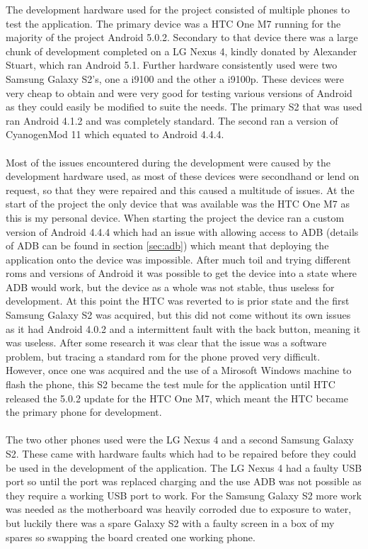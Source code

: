 The development hardware used for the project consisted of multiple phones to test the application. The primary device was a HTC One M7 running for the majority of the project Android 5.0.2. Secondary to that device there was a large chunk of development completed on a LG Nexus 4, kindly donated by Alexander Stuart, which ran Android 5.1. Further hardware consistently used were two Samsung Galaxy S2's, one a i9100 and the other a i9100p. These devices were very cheap to obtain and were very good for testing various versions of Android as they could easily be modified to suite the needs. The primary S2 that was used ran Android 4.1.2 and was completely standard. The second ran a version of CyanogenMod 11 which equated to Android 4.4.4.\\
\\
Most of the issues encountered during the development were caused by the development hardware used, as most of these devices were secondhand or lend on request, so that they were repaired and this caused a multitude of issues. At the start of the project the only device that was available was the HTC One M7 as this is my personal device. When starting the project the device ran a custom version of Android 4.4.4 which had an issue with allowing access to ADB (details of ADB can be found in section \ref{sec:adb}) which meant that deploying the application onto the device was impossible. After much toil and trying different roms and versions of Android it was possible to get the device into a state where ADB would work, but the device as a whole was not stable, thus useless for development. At this point the HTC was reverted to is prior state and the first Samsung Galaxy S2 was acquired, but this did not come without its own issues as it had Android 4.0.2 and a intermittent fault with the back button, meaning it was useless. After some research it was clear that the issue was a software problem, but tracing a standard rom for the phone proved very difficult. However, once one was acquired and the use of a Mirosoft Windows machine to flash the phone, this S2 became the test mule for the application until HTC released the 5.0.2 update for the HTC One M7, which meant the HTC became the primary phone for development.\\
\\
The two other phones used were the LG Nexus 4 and a second Samsung Galaxy S2. These came with hardware faults which had to be repaired before they could be used in the development of the application. The LG Nexus 4 had a faulty USB port so until the port was replaced charging and the use ADB was not possible as they require a working USB port to work. For the Samsung Galaxy S2 more work was needed as the motherboard was heavily corroded due to exposure to water, but luckily there was a spare Galaxy S2 with a faulty screen in a box of my spares so swapping the board created one working phone.\\
